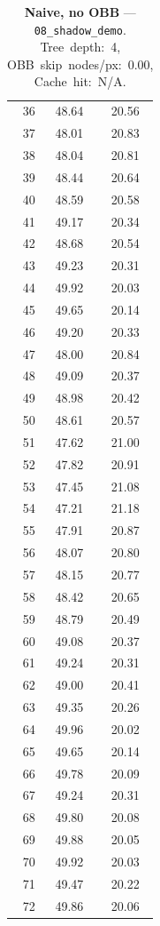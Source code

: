 \begin{table}[htbp]
\begin{tabular}{@{}rcc@{}}
    36 & 48.64 & 20.56 \\
    37 & 48.01 & 20.83 \\
    38 & 48.04 & 20.81 \\
    39 & 48.44 & 20.64 \\
    40 & 48.59 & 20.58 \\
    41 & 49.17 & 20.34 \\
    42 & 48.68 & 20.54 \\
    43 & 49.23 & 20.31 \\
    44 & 49.92 & 20.03 \\
    45 & 49.65 & 20.14 \\
    46 & 49.20 & 20.33 \\
    47 & 48.00 & 20.84 \\
    48 & 49.09 & 20.37 \\
    49 & 48.98 & 20.42 \\
    50 & 48.61 & 20.57 \\
    51 & 47.62 & 21.00 \\
    52 & 47.82 & 20.91 \\
    53 & 47.45 & 21.08 \\
    54 & 47.21 & 21.18 \\
    55 & 47.91 & 20.87 \\
    56 & 48.07 & 20.80 \\
    57 & 48.15 & 20.77 \\
    58 & 48.42 & 20.65 \\
    59 & 48.79 & 20.49 \\
    60 & 49.08 & 20.37 \\
    61 & 49.24 & 20.31 \\
    62 & 49.00 & 20.41 \\
    63 & 49.35 & 20.26 \\
    64 & 49.96 & 20.02 \\
    65 & 49.65 & 20.14 \\
    66 & 49.78 & 20.09 \\
    67 & 49.24 & 20.31 \\
    68 & 49.80 & 20.08 \\
    69 & 49.88 & 20.05 \\
    70 & 49.92 & 20.03 \\
    71 & 49.47 & 20.22 \\
    72 & 49.86 & 20.06 \\
    \bottomrule
  \end{tabular}
  \caption{\textbf{Naive, no OBB} --- \texttt{08\_shadow\_demo}. Tree~depth:~4, OBB~skip~nodes/px:~0.00, Cache~hit:~N/A.}
  \label{tab:rt-08-shadow-demo-Naive-no-OBB}
\end{table}

